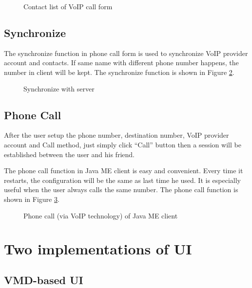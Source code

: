 \begin{figure}[!hbtp]
\centering
{}
\caption{Contact list of VoIP call form}
\label{fig:ContactListOfVoIPCallForm}
\end{figure}

\subsection{Synchronize}

The synchronize function in phone call form is used to synchronize VoIP provider account and contacts. If same name with different phone number happens, the number in client will be kept. The synchronize function is shown in Figure \ref{fig:SynchronizeWithServer}.

\begin{figure}[!hbtp]
\centering
{}
\caption{Synchronize with server}
\label{fig:SynchronizeWithServer}
\end{figure}

\subsection{Phone Call}

After the user setup the phone number, destination number, VoIP provider account and Call method, just simply click ``Call'' button then a session will be established between the user and his friend.    

The phone call function in Java ME client is easy and convenient. Every time it restarts, the configuration will be the same as last time he used. It is especially useful when the user always calls the same number. The phone call function is shown in Figure \ref{fig:PhoneCallOfJavaMEClient}.

\begin{figure}[!hbtp]
\centering
{}
\caption{Phone call (via VoIP technology) of Java ME client}
\label{fig:PhoneCallOfJavaMEClient}
\end{figure}

\section{Two implementations of UI}

\subsection{VMD-based UI}
\label{sec:JavaMEClient:UserInterface:VMDBasedUI}

